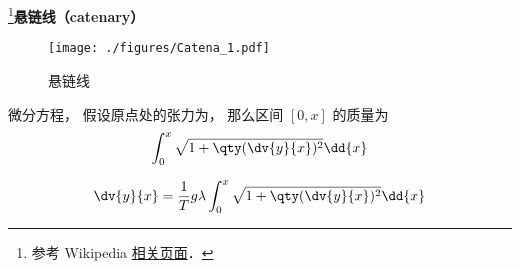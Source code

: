 
\footnote{参考 Wikipedia \href{https://en.wikipedia.org/wiki/Catenary}{相关页面}．}\textbf{悬链线（catenary）}

\begin{figure}[ht]
\centering
\texttt{[image: ./figures/Catena\_1.pdf]}
\caption{悬链线} \label{Catena_fig1}
\end{figure}

微分方程， 假设原点处的张力为， 那么区间 $[0, x]$ 的质量为
\begin{equation}
\int_0^x \sqrt{1 + \qty(\dv{y}{x})^2} \dd{x}
\end{equation}

\begin{equation}
\dv{y}{x} = \frac{1}{T} g\lambda \int_0^x \sqrt{1 + \qty(\dv{y}{x})^2} \dd{x}
\end{equation}

